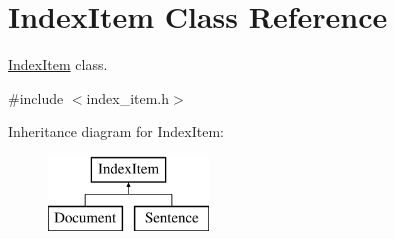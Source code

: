\hypertarget{class_index_item}{}\section{Index\+Item Class Reference}
\label{class_index_item}


\hyperlink{class_index_item}{Index\+Item} class.  




{\ttfamily \#include $<$index\+\_\+item.\+h$>$}

Inheritance diagram for Index\+Item\+:\begin{figure}[H]
\begin{center}
\leavevmode
\includegraphics[height=2.000000cm]{class_index_item}
\end{center}
\end{figure}

